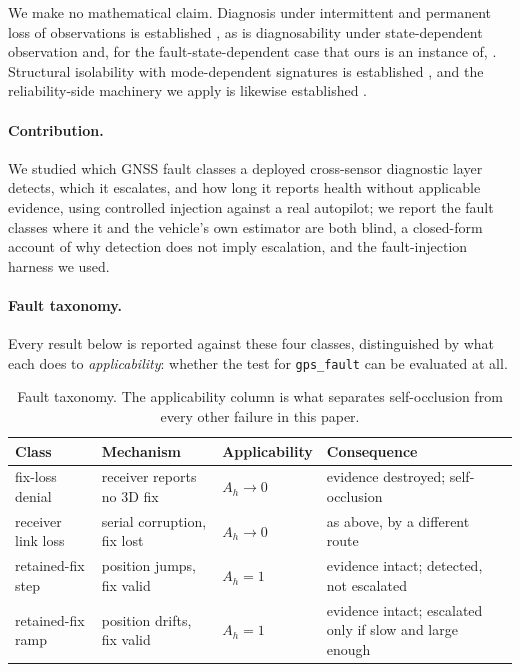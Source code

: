 \documentclass[11pt,a4paper]{article}
\newcommand{\code}[1]{\texttt{\small #1}}
\begin{document}
We make no mathematical claim. Diagnosis under intermittent and permanent loss
of observations is established
\cite{carvalho2012intermittent,carvalho2013permanent}, as is diagnosability
under state-dependent observation \cite{yin_phidiagnosability} and, for the
fault-state-dependent case that ours is an instance of,
\cite{dong2024statedependent}. Structural isolability with mode-dependent
signatures is established
\cite{krysander2024multimode,krysander2008sensorplacement}, and the
reliability-side machinery we apply is likewise established
\cite{hurdle2007faulttree,reeves2019sensorselection}.

\paragraph{Contribution.} We studied which GNSS fault classes a deployed
cross-sensor diagnostic layer detects, which it escalates, and how long it
reports health without applicable evidence, using controlled injection against
a real autopilot; we report the fault classes where it and the vehicle's own
estimator are both blind, a closed-form account of why detection does not
imply escalation, and the fault-injection harness we used.

\paragraph{Fault taxonomy.} Every result below is reported against these four
classes, distinguished by what each does to \emph{applicability}: whether the
test for \code{gps\_fault} can be evaluated at all.

\begin{table}[h]
\centering
\small
\begin{tabular}{p{}p{}p{}p{}}
\toprule
Class & Mechanism & Applicability & Consequence \\
\midrule
fix-loss denial & receiver reports no 3D fix &
$A_h \to 0$ & evidence destroyed; self-occlusion \\
receiver link loss & serial corruption, fix lost &
$A_h \to 0$ & as above, by a different route \\
retained-fix step & position jumps, fix valid &
$A_h = 1$ & evidence intact; detected, not escalated \\
retained-fix ramp & position drifts, fix valid &
$A_h = 1$ & evidence intact; escalated only if slow and large enough \\
\bottomrule
\end{tabular}
\caption{Fault taxonomy. The applicability column is what separates
self-occlusion from every other failure in this paper.}
\label{tab:taxonomy}
\end{table}
\end{document}
